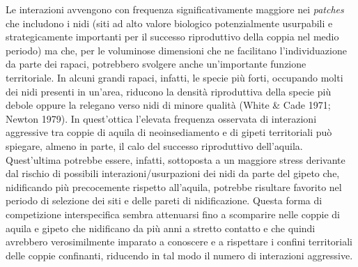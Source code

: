 Le interazioni avvengono con frequenza significativamente maggiore nei
\textit{patches} che includono i nidi (siti ad alto valore biologico
potenzialmente usurpabili e strategicamente importanti per il successo
riproduttivo della coppia nel medio periodo) ma che, per le voluminose
dimensioni che ne facilitano l{\textquoteright}individuazione da parte
dei rapaci, potrebbero svolgere anche un{\textquoteright}importante
funzione territoriale. In alcuni grandi rapaci, infatti, le specie
pi\`u forti, occupando molti dei nidi presenti in
un{\textquoteright}area, riducono la densit\`a riproduttiva della
specie pi\`u debole oppure la relegano verso nidi di minore qualit\`a
(White \& Cade 1971; Newton 1979). In quest{\textquoteright}ottica
l{\textquoteright}elevata frequenza osservata di interazioni aggressive
tra coppie di aquila di neoinsediamento e di gipeti territoriali pu\`o
spiegare, almeno in parte, il calo del successo riproduttivo
dell{\textquoteright}aquila. Quest{\textquoteright}ultima potrebbe
essere, infatti, sottoposta a un maggiore stress derivante dal rischio
di possibili interazioni/usurpazioni dei nidi da parte del gipeto che,
nidificando pi\`u precocemente rispetto all{\textquoteright}aquila,
potrebbe risultare favorito nel periodo di selezione dei siti e delle
pareti di nidificazione. Questa forma di competizione interspecifica
sembra attenuarsi fino a scomparire nelle coppie di aquila e gipeto che
nidificano da pi\`u anni a stretto contatto e che quindi avrebbero
verosimilmente imparato a conoscere e a rispettare i confini
territoriali delle coppie confinanti, riducendo in tal modo il numero
di interazioni aggressive.

